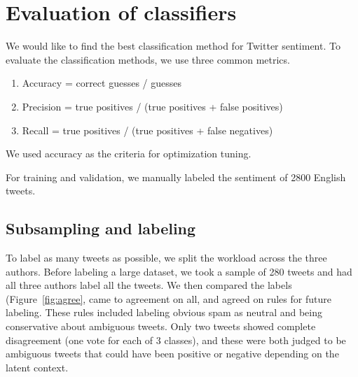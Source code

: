 \section{Evaluation of classifiers}
\label{sec:eval}

We would like to find the best classification method for Twitter
sentiment.
To evaluate the classification methods, we use three common metrics.
\begin{enumerate}
\item Accuracy = correct guesses / guesses
\item Precision = true positives / (true positives + false positives)
\item Recall = true positives / (true positives + false negatives)
\end{enumerate}
We used accuracy as the criteria for optimization tuning. 

For training and validation, we manually labeled the sentiment of 2800 English
tweets.

\subsection{Subsampling and labeling}

To label as many tweets as possible, we split the workload across the
three authors. Before labeling a large dataset, we took a sample of 280 tweets and had
all three authors label all the tweets. We then compared the labels
(Figure~\ref{fig:agree},
came to agreement on all, and agreed on rules for future labeling.
These rules included labeling obvious spam as neutral and being
conservative about ambiguous tweets. Only two tweets showed complete
disagreement (one vote for each of 3 classes), and these were both judged to
be ambiguous tweets that could have been positive or negative
depending on the latent context.

